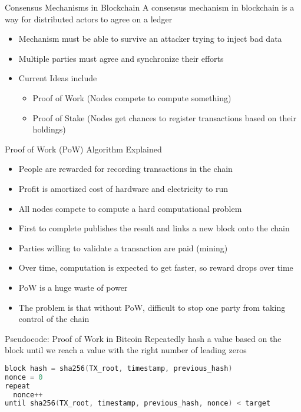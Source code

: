 \begin{withoutheadline}
\begin{frame}{Consensus Mechanisms in Blockchain}
    A consensus mechanism in blockchain is a way for distributed actors to agree on a ledger
    \begin{itemize}
        \item Mechanism must be able to survive an attacker trying to inject bad data
        \item Multiple parties must agree and synchronize their efforts
        \item Current Ideas include
        \begin{itemize}
            \item Proof of Work (Nodes compete to compute something)
            \item Proof of Stake (Nodes get chances to register transactions based on their holdings)
        \end{itemize}
    \end{itemize}
\end{frame}

\begin{frame}{Proof of Work (PoW) Algorithm Explained}
    \begin{itemize}
        \item People are rewarded for recording transactions in the chain
        \item Profit is amortized cost of hardware and electricity to run
        \item All nodes compete to compute a hard computational problem
        \item First to complete publishes the result and links a new block onto the chain
        \item Parties willing to validate a transaction are paid (mining)
        \item Over time, computation is expected to get faster, so reward drops over time
        \item PoW is a huge waste of power
        \item The problem is that without PoW, difficult to stop one party from taking control of the chain
    \end{itemize}
\end{frame}

\begin{frame}[fragile]{Pseudocode: Proof of Work in Bitcoin}
    Repeatedly hash a value based on the block until we reach a value with the right number of leading zeros
\begin{lstlisting}[language=c++]
block hash = sha256(TX_root, timestamp, previous_hash)
nonce = 0
repeat
  nonce++
until sha256(TX_root, timestamp, previous_hash, nonce) < target
\end{lstlisting}
\end{frame}


\end{withoutheadline}
